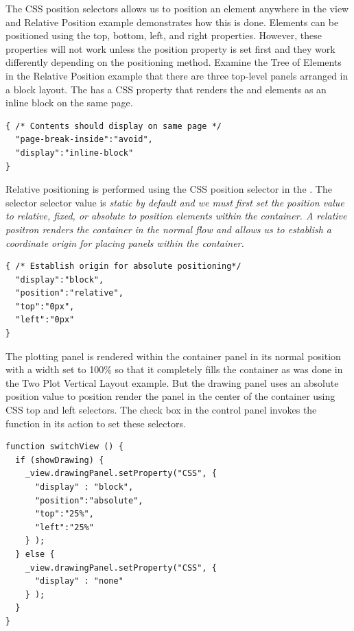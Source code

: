The CSS position selectors allows us to position an element anywhere in the view and  Relative Position example demonstrates how this is done.  Elements can be positioned using the top, bottom, left, and right properties. However, these properties will not work unless the position property is set first and they work differently depending on the positioning method.  Examine the Tree of Elements in the Relative Position example that there are three top-level panels arranged in a block layout.  The  has a CSS property that renders the  and  elements as an inline block on the same page.

\begin{listing}
\begin{verbatim}
{ /* Contents should display on same page */
  "page-break-inside":"avoid",
  "display":"inline-block"
}
\end{verbatim}
\end{listing}

Relative positioning is performed using the CSS position selector in the .  The selector selector value is \em{static} by default and we must first set the position value to \em{relative}, \em{fixed}, or \em{absolute} to position elements within the container. A relative positron renders the container in the normal flow and allows us to establish a coordinate origin for placing panels within the container.

\begin{listing}
\begin{verbatim}
{ /* Establish origin for absolute positioning*/
  "display":"block",
  "position":"relative",
  "top":"0px",
  "left":"0px"
}
\end{verbatim}
\end{listing}
The plotting panel is rendered within the container panel in its normal position with a width set to 100\% so that it completely fills the container as was done in the Two Plot Vertical Layout example.  But the drawing panel uses an absolute position value to position render the panel in the center of the container using CSS top and left selectors.  The check box in the control panel invokes the   function in its  action to set these selectors.
\begin{listing}
\begin{verbatim}
function switchView () {
  if (showDrawing) {
    _view.drawingPanel.setProperty("CSS", {
      "display" : "block",
      "position":"absolute",
      "top":"25%",
      "left":"25%"
    } );
  } else {
    _view.drawingPanel.setProperty("CSS", {
      "display" : "none"
    } );
  }
}
\end{verbatim}
\end{listing}


